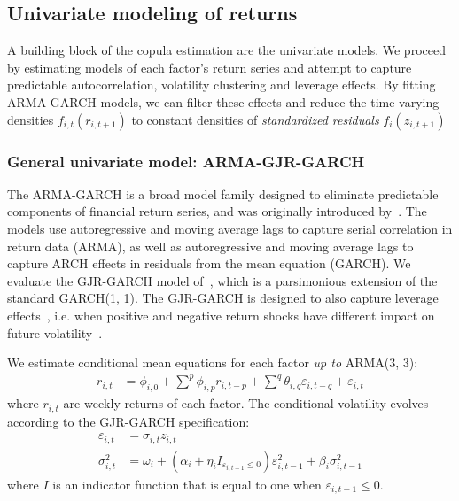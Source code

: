 
\subsection{Univariate modeling of returns} %
\label{sub:univariate_modeling_of_returns}

A building block of the copula estimation are the univariate models. We proceed by estimating models of each factor's return series and attempt to capture predictable autocorrelation, volatility clustering and leverage effects. By fitting ARMA-GARCH models, we can filter these effects and reduce the time-varying densities $f_{i,t}(r_{i,t+1})$ to constant densities of \emph{standardized residuals} $f_{i}(z_{i,t+1})$

\subsubsection{General univariate model: ARMA-GJR-GARCH}

The ARMA-GARCH is a broad model family designed to eliminate predictable components of financial return series, and was originally introduced by~\textcite{Bollerslev1986}. The models use autoregressive and moving average lags to capture serial correlation in return data (ARMA), as well as autoregressive and moving average lags to capture ARCH effects in residuals from the mean equation (GARCH). We evaluate the GJR-GARCH model of~\textcite{glosten1993relation}, which is a parsimonious extension of the standard GARCH(1, 1). The GJR-GARCH is designed to also capture leverage effects~\autocite{glosten1993relation}, i.e. when positive and negative return shocks have different impact on future volatility~\autocite{Black1976}.

We estimate conditional mean equations for each factor \emph{up to} ARMA(3, 3):
\begin{align}
  r_{i,t} &=
    \phi_{i,0} +
    \sum^p \phi_{i,p} r_{i,t - p} +
    \sum^q \theta_{i,q} \varepsilon_{i,t - q} + 
    \varepsilon_{i,t}
    \label{eq:garch_mean}
\end{align}
where $r_{i,t}$ are weekly returns of each factor. The conditional volatility evolves according to the GJR-GARCH specification:
\begin{align}
  \varepsilon_{i,t} &= \sigma_{i,t} z_{i,t} \\
  \sigma_{i,t}^2 &=
    \omega_i +
    (\alpha_i + \eta_i I_{\varepsilon_{i,t-1} \leq 0}) \varepsilon_{i,t - 1}^2 +
    \beta_{i} \sigma^2_{i,t - 1}
    \label{eq:garch_garch}
\end{align}
where $I$ is an indicator function that is equal to one when $\varepsilon_{i,t-1} \leq 0$. 

